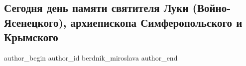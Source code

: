 
 
 
 
 
 
\subsection{Сегодня день памяти святителя Луки (Войно-Ясенецкого), архиепископа Симферопольского и Крымского}
\label{sec:11_06_2021.fb.berdnik_miroslava.1.svjatitel_luka_kiev}
\ifcmt
 author_begin
   author_id berdnik_miroslava
 author_end
\fi

